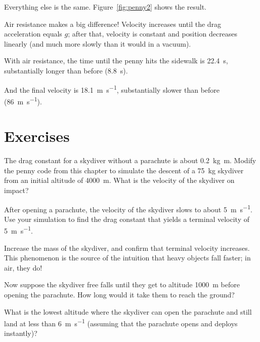 \documentclass[
]{book}
\numberwithin{Answer}{chapter}
\numberwithin{Exercise}{chapter}
\begin{document}
Everything else is the same.  Figure~\ref{fig:penny2} shows the result. 

Air resistance makes a big difference!  Velocity increases until
the drag acceleration equals $g$; after that, velocity is constant and position decreases linearly (and much more slowly than it would in a vacuum).

With air resistance, the time until the penny hits the sidewalk is \SI{22.4}{\second}, substantially longer than before (\SI{8.8}{\second}).

And the final velocity is \SI{18.1}{\meter \per \second}, substantially slower than before (\SI{86}{\meter \per \second}).


%
%
%
%


\section{Exercises}


\begin{ex}


The drag constant for a skydiver without a parachute is about \SI{0.2}{\kilogram \meter}.  Modify the penny code from this chapter to simulate the descent of a \SI{75}{\kilogram} skydiver from an initial altitude of \SI{4000}{\meter}.  What is the velocity of the skydiver on impact?

After opening a parachute, the velocity of the skydiver slows to about \SI{5}{\meter\per\second}.  Use your simulation to find the drag constant that yields a terminal velocity of \SI{5}{\meter\per\second}.

Increase the mass of the skydiver, and confirm that terminal velocity increases.  This phenomenon is the source of the intuition that heavy objects fall faster; in air, they do!

Now suppose the skydiver free falls until they get to altitude \SI{1000}{\meter} before opening the parachute.  How long would it take them to reach the ground?

What is the lowest altitude where the skydiver can open the parachute and still land at less than \SI{6}{\meter\per\second} (assuming that the parachute opens and deploys instantly)?

\end{ex}
\end{document}

